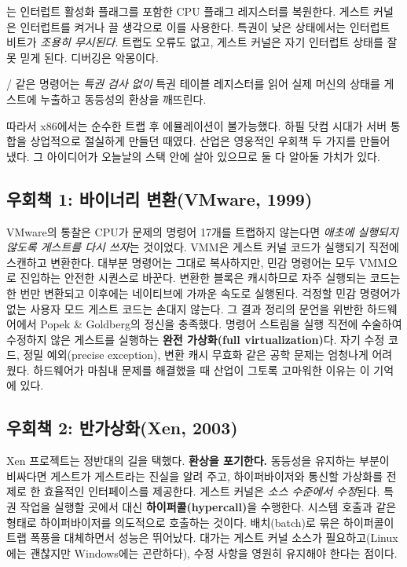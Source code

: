 \begin{tbbitemize}
  \item {}는 인터럽트 활성화 플래그를 포함한 CPU 플래그 레지스터를 복원한다. 게스트 커널은 인터럽트를 켜거나 끌 생각으로 이를 사용한다. 특권이 낮은 상태에서는 인터럽트 비트가 \textit{조용히 무시된다}. 트랩도 오류도 없고, 게스트 커널은 자기 인터럽트 상태를 잘못 믿게 된다. 디버깅은 악몽이다.
  \item {}/ 같은 명령어는 \textit{특권 검사 없이} 특권 테이블 레지스터를 읽어 실제 머신의 상태를 게스트에 누출하고 동등성의 환상을 깨뜨린다.
\end{tbbitemize}

따라서 x86에서는 순수한 트랩 후 에뮬레이션이 불가능했다. 하필 닷컴 시대가 서버 통합을 상업적으로 절실하게 만들던 때였다. 산업은 영웅적인 우회책 두 가지를 만들어 냈다. 그 아이디어가 오늘날의 스택 안에 살아 있으므로 둘 다 알아둘 가치가 있다.

\subsection*{우회책 1: 바이너리 변환(VMware, 1999)}

VMware의 통찰은 CPU가 문제의 명령어 17개를 트랩하지 않는다면 \textit{애초에 실행되지 않도록 게스트를 다시 쓰자}는 것이었다. VMM은 게스트 커널 코드가 실행되기 직전에 스캔하고 변환한다. 대부분 명령어는 그대로 복사하지만, 민감 명령어는 모두 VMM으로 진입하는 안전한 시퀀스로 바꾼다. 변환한 블록은 캐시하므로 자주 실행되는 코드는 한 번만 변환되고 이후에는 네이티브에 가까운 속도로 실행된다. 걱정할 민감 명령어가 없는 사용자 모드 게스트 코드는 손대지 않는다. 그 결과 정리의 문언을 위반한 하드웨어에서 Popek \& Goldberg의 정신을 충족했다. 명령어 스트림을 실행 직전에 수술하여 수정하지 않은 게스트를 실행하는 \textbf{완전 가상화(full virtualization)}다. 자기 수정 코드, 정밀 예외(precise exception), 변환 캐시 무효화 같은 공학 문제는 엄청나게 어려웠다. 하드웨어가 마침내 문제를 해결했을 때 산업이 그토록 고마워한 이유는 이 기억에 있다.

\subsection*{우회책 2: 반가상화(Xen, 2003)}

Xen 프로젝트는 정반대의 길을 택했다. \textbf{환상을 포기한다.} 동등성을 유지하는 부분이 비싸다면 게스트가 게스트라는 진실을 알려 주고, 하이퍼바이저와 통신할 가상화를 전제로 한 효율적인 인터페이스를 제공한다. 게스트 커널은 \textit{소스 수준에서 수정}된다. 특권 작업을 실행할 곳에서 대신 \textbf{하이퍼콜(hypercall)}을 수행한다. 시스템 호출과 같은 형태로 하이퍼바이저를 의도적으로 호출하는 것이다. 배치(batch)로 묶은 하이퍼콜이 트랩 폭풍을 대체하면서 성능은 뛰어났다. 대가는 게스트 커널 소스가 필요하고(Linux에는 괜찮지만 Windows에는 곤란하다), 수정 사항을 영원히 유지해야 한다는 점이다.

